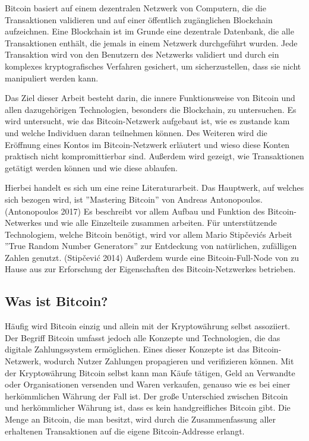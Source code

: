 Bitcoin basiert auf einem dezentralen Netzwerk von Computern, die die Transaktionen validieren und auf einer öffentlich 
zugänglichen Blockchain aufzeichnen. Eine Blockchain ist im Grunde eine dezentrale Datenbank, die alle Transaktionen enthält, 
die jemals in einem Netzwerk durchgeführt wurden. Jede Transaktion wird von den Benutzern des Netzwerks validiert und durch ein 
komplexes kryptografisches Verfahren gesichert, um sicherzustellen, dass sie nicht manipuliert werden kann.

Das Ziel dieser Arbeit besteht darin, die innere Funktionsweise von Bitcoin und allen dazugehörigen Technologien, besonders die
Blockchain, zu untersuchen. Es wird untersucht, wie das Bitcoin-Netzwerk aufgebaut ist, wie es zustande kam und welche
Individuen daran teilnehmen können. Des Weiteren wird die Eröffnung eines Kontos im Bitcoin-Netzwerk erläutert und wieso diese Konten 
praktisch nicht kompromittierbar sind. Außerdem wird gezeigt, wie Transaktionen getätigt werden können und wie diese ablaufen.

Hierbei handelt es sich um eine reine Literaturarbeit. Das Hauptwerk, auf welches sich bezogen wird, ist ''Mastering Bitcoin''
von Andreas Antonopoulos. (Antonopoulos 2017) Es beschreibt vor allem Aufbau und Funktion des Bitcoin-Netwerkes und wie 
alle Einzelteile zusammen arbeiten. Für unterstützende Technologiem, welche Bitcoin benötigt, wird vor allem Mario Stipčevićs
Arbeit ''True Random Number Generators'' zur Entdeckung von natürlichen, zufälligen Zahlen genutzt. (Stipčević 2014) Außerdem
wurde eine Bitcoin-Full-Node von zu Hause aus zur Erforschung der Eigenschaften des Bitcoin-Netzwerkes betrieben.

\subsection{Was ist Bitcoin?}
Häufig wird Bitcoin einzig und allein mit der Kryptowährung selbst assoziiert. Der Begriff Bitcoin umfasst jedoch alle 
Konzepte und Technologien, die das digitale Zahlungssystem ermöglichen.  Eines dieser Konzepte ist das Bitcoin-Netzwerk, wodurch
Nutzer Zahlungen propagieren und verifizieren können. Mit der Kryptowährung Bitcoin selbst kann man Käufe tätigen, Geld an 
Verwandte oder Organisationen versenden und Waren verkaufen, genauso wie es bei einer herkömmlichen Währung der Fall ist. Der 
große Unterschied zwischen Bitcoin und herkömmlicher Währung ist, dass es kein handgreifliches Bitcoin gibt. Die Menge an 
Bitcoin, die man besitzt, wird durch die Zusammenfassung aller erhaltenen Transaktionen auf die eigene Bitcoin-Addresse erlangt. 

